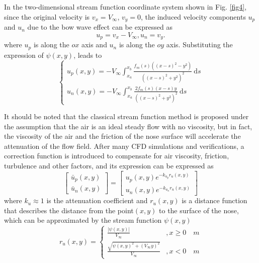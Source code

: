 In the two-dimensional stream function coordinate system shown in Fig. \ref{fig4}, since the original velocity is $v_x=V_\infty$, $v_y=0$, the induced velocity components $u_p$ and $u_n$ due to the bow wave effect can be expressed as
\begin{equation}\label{eq32}
u_p=v_x-V_{\infty}, u_n=v_y .
\end{equation}
where $u_p$ is along the $ox$ axis and $u_n$ is along the $oy$ axis. Substituting the expression of $\psi(x,y)$, leads to
\begin{equation}\label{eq33}
\left\{\begin{array}{l}
u_p(x, y)=-V_{\infty} \int_{x_a}^{x_b} \frac{f_m(s)\left((x-s)^2-y^2\right)}{\left((x-s)^2+y^2\right)^2} \mathrm{~d} s \\
u_n(x, y)=-V_{\infty} \int_{x_a}^{x_b} \frac{2 f_m(s)(x-s) y}{\left((x-s)^2+y^2\right)^2} \mathrm{~d} s
\end{array}\right.
\end{equation}

It should be noted that the classical stream function method is proposed under the assumption that the air is an ideal steady flow with no viscosity, but in fact, the viscosity of the air and the friction of the nose surface will accelerate the attenuation of the flow field. After many CFD simulations and verifications, a correction function is introduced to compensate for air viscosity, friction, turbulence and other factors, and its expression can be expressed as
\begin{equation}\label{eq34}
\left[\begin{array}{c}
\bar{u}_p(x, y) \\
\bar{u}_n(x, y)
\end{array}\right]=\left[\begin{array}{l}
u_p(x, y) e^{-k_{u_p} r_u(x, y)} \\
u_n(x, y) e^{-k_{u_n} r_u(x, y)}
\end{array}\right]
\end{equation}
where $k_u\approx 1$ is the attenuation coefficient and $r_u(x,y)$ is a distance function that describes the distance from the point$(x,y)$ to the surface of the nose, which can be approximated by the stream function $\psi(x,y)$ 
\begin{equation}\label{eq35}
r_u(x, y)= \begin{cases}\frac{|\psi(x, y)|}{V_{\infty}} & , x \geq 0\quad m \\ \frac{\sqrt{\psi(x, y)^2+\left(V_{\infty} y\right)^2}}{V_{\infty}} & , x<0\quad m\end{cases}
\end{equation}


